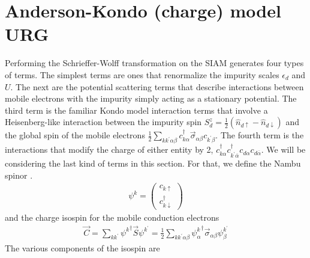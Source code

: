 \documentclass[twoside,11pt]{report}
\numberwithin{equation}{section}
\begin{document}
\section{Anderson-Kondo (charge) model URG}
Performing the Schrieffer-Wolff transformation on the SIAM generates four types of terms.
The simplest terms are ones that renormalize the impurity scales \(\epsilon_d\) and \(U\).
The next are the potential scattering terms that describe interactions between mobile electrons with the impurity simply acting as a stationary potential.
The third term is the familiar Kondo model interaction terms that involve a Heisenberg-like interaction between the impurity spin \(S_d^z = \frac{1}{2}\left(\hat n_{d\uparrow} - \hat n_{d\downarrow}\right)\) and the global spin of the mobile electrons \(\frac{1}{2}\sum_{kk^\prime \alpha\beta}c^\dagger_{k\alpha}\vec\sigma_{\alpha\beta}c_{k^\prime\beta}\).
The fourth term is the interactions that modify the charge of either entity by 2, \(c^\dagger_{k\alpha}c^\dagger_{k^\prime\overline\alpha}c_{d\alpha}c_{d\overline\alpha}\).
We will be considering the last kind of terms in this section.
For that, we define the Nambu spinor \cite{nambu,anderson_superc}.
\begin{equation}\begin{aligned}
\psi^k = \begin{pmatrix} c_{k\uparrow} \\ c^\dagger_{k\downarrow} \end{pmatrix}
\end{aligned}\end{equation}
and the charge isospin \cite{charge-kondo-Zitko} for the mobile conduction electrons
\begin{equation}\begin{aligned}
\vec C = \sum_{kk^\prime} {\psi^k}^\dagger \vec S \psi^{k^\prime} = \frac{1}{2}\sum_{kk^\prime\alpha\beta} {\psi^k_\alpha}^\dagger \vec \sigma_{\alpha\beta} \psi^{k^\prime}_\beta
\end{aligned}\end{equation}
The various components of the isospin are
\end{document}
